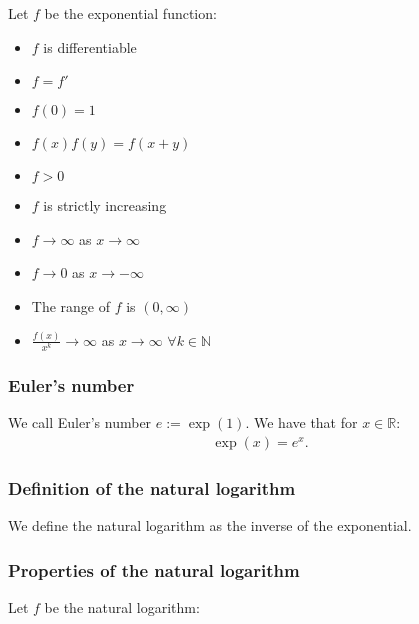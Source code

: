 \documentclass[a4paper, 12pt, twoside]{article}
\begin{document}
Let $f$ be the exponential function:

\begin{multicols}{2}
      \begin{itemize}
            \item $f$ is differentiable
            \item $f = f'$
            \item $f(0) = 1$
            \item $f(x)f(y) = f(x + y)$
            \item $f > 0$
      \end{itemize}
      \columnbreak
      \begin{itemize}
            \item $f$ is strictly increasing
            \item $f \to \infty$ as $x \to \infty$
            \item $f \to 0$ as $x \to -\infty$
            \item The range of $f$ is $(0, \infty)$
            \item $\frac{f(x)}{x^k} \to \infty$ as
                  $x \to \infty$ $\forall k \in \mathbb{N}$
      \end{itemize}
\end{multicols}

\subsubsection{Euler's number}

We call Euler's number $e := \exp(1)$. We have that for $x \in \mathbb{R}$:
\begin{align*}
      \exp(x) = e^x.
\end{align*}

\subsubsection{Definition of the natural logarithm}

We define the natural logarithm as the inverse of the exponential.

\subsubsection{Properties of the natural logarithm}

Let $f$ be the natural logarithm:
\end{document}
